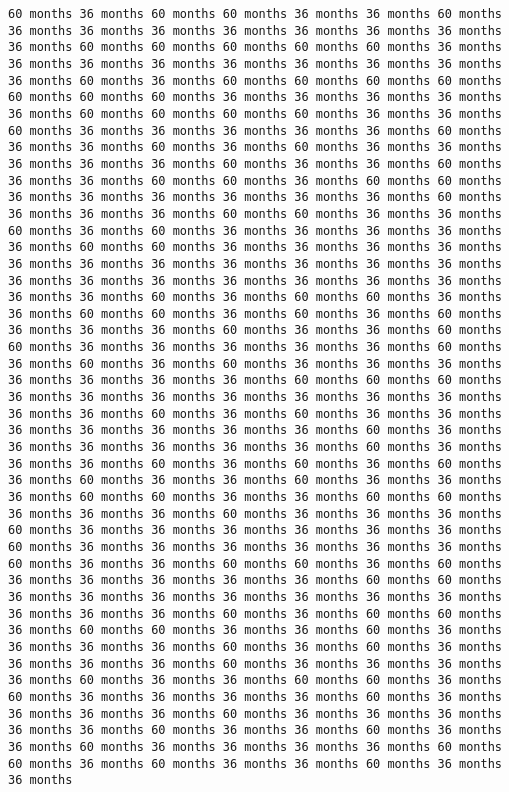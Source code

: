 \documentclass[11pt]{article}
\begin{document}
\begin{Verbatim}[commandchars=\\\{\}, frame=single, framerule=2mm, rulecolor=\color{outerrorbackground}]
60 months 36 months 60 months 60 months 36 months 36 months 60 months 36 months 36 months 36 months 36 months 36 months 36 months 36 months 36 months 60 months 60 months 60 months 60 months 60 months 36 months 36 months 36 months 36 months 36 months 36 months 36 months 36 months 36 months 60 months 36 months 60 months 60 months 60 months 60 months 60 months 60 months 60 months 36 months 36 months 36 months 36 months 36 months 60 months 60 months 60 months 60 months 36 months 36 months 60 months 36 months 36 months 36 months 36 months 36 months 60 months 36 months 36 months 60 months 36 months 60 months 36 months 36 months 36 months 36 months 36 months 60 months 36 months 36 months 60 months 36 months 36 months 60 months 60 months 36 months 60 months 60 months 36 months 36 months 36 months 36 months 36 months 36 months 60 months 36 months 36 months 36 months 60 months 60 months 36 months 36 months 60 months 36 months 60 months 36 months 36 months 36 months 36 months 36 months 60 months 60 months 36 months 36 months 36 months 36 months 36 months 36 months 36 months 36 months 36 months 36 months 36 months 36 months 36 months 36 months 36 months 36 months 36 months 36 months 36 months 36 months 60 months 36 months 60 months 60 months 36 months 36 months 60 months 60 months 36 months 60 months 36 months 60 months 36 months 36 months 36 months 60 months 36 months 36 months 60 months 60 months 36 months 36 months 36 months 36 months 36 months 60 months 36 months 60 months 36 months 60 months 36 months 36 months 36 months 36 months 36 months 36 months 36 months 60 months 60 months 60 months 36 months 36 months 36 months 36 months 36 months 36 months 36 months 36 months 36 months 60 months 36 months 60 months 36 months 36 months 36 months 36 months 36 months 36 months 36 months 60 months 36 months 36 months 36 months 36 months 36 months 36 months 60 months 36 months 36 months 36 months 60 months 36 months 60 months 36 months 60 months 36 months 60 months 36 months 36 months 60 months 36 months 36 months 36 months 60 months 60 months 36 months 36 months 60 months 60 months 36 months 36 months 36 months 60 months 36 months 36 months 36 months 60 months 36 months 36 months 36 months 36 months 36 months 36 months 60 months 36 months 36 months 36 months 36 months 36 months 36 months 60 months 36 months 36 months 60 months 60 months 36 months 60 months 36 months 36 months 36 months 36 months 36 months 60 months 60 months 36 months 36 months 36 months 36 months 36 months 36 months 36 months 36 months 36 months 36 months 60 months 36 months 60 months 60 months 36 months 60 months 60 months 36 months 36 months 60 months 36 months 36 months 36 months 36 months 60 months 36 months 60 months 36 months 36 months 36 months 36 months 60 months 36 months 36 months 36 months 36 months 60 months 36 months 36 months 60 months 60 months 36 months 60 months 36 months 36 months 36 months 36 months 60 months 36 months 36 months 36 months 36 months 60 months 36 months 36 months 36 months 36 months 36 months 60 months 36 months 36 months 60 months 36 months 36 months 60 months 36 months 36 months 36 months 36 months 60 months 60 months 36 months 60 months 36 months 36 months 60 months 36 months 36 months 
\end{Verbatim}
\end{document}

